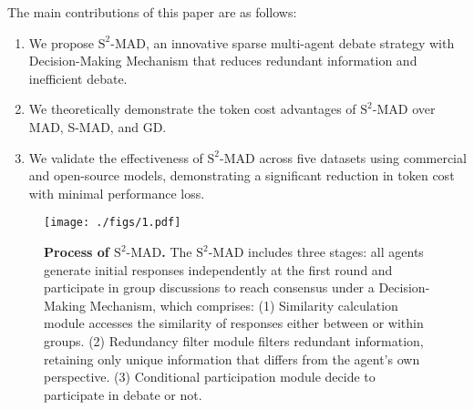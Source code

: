 The main contributions of this paper are as follows:
\begin{enumerate}
    \item We propose \({\text{S}^2\text{-MAD}}\), an innovative sparse multi-agent debate strategy with Decision-Making Mechanism that reduces redundant information and inefficient debate. 
    \item We theoretically demonstrate the token cost advantages of \({\text{S}^2\text{-MAD}}\) over MAD, S-MAD, and GD.
    \item We validate the effectiveness of \({\text{S}^2\text{-MAD}}\) across five datasets using commercial and open-source models, demonstrating a significant reduction in token cost with minimal performance loss.


\end{enumerate}

\begin{figure*}[t]
    \centering
    \texttt{[image: ./figs/1.pdf]}
     \caption{\textbf{Process of \({\text{S}^2\text{-MAD}}\).} The \({\text{S}^2\text{-MAD}}\) includes three stages: all agents generate initial responses independently at the first round and participate in group discussions to reach consensus under a Decision-Making Mechanism, which comprises: (1) Similarity calculation module accesses the similarity of responses either between or within groups. (2) Redundancy filter module filters redundant information, retaining only unique information that differs from the agent's own perspective. (3) Conditional participation module decide to participate in debate or not.
}
    \label{fig:framework}
    \vspace{-1.0 em}
\end{figure*}